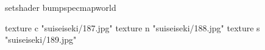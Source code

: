 setshader bumpspecmapworld

    texture c "suiseiseki/187.jpg"
    texture n "suiseiseki/188.jpg"
    texture s "suiseiseki/189.jpg"
